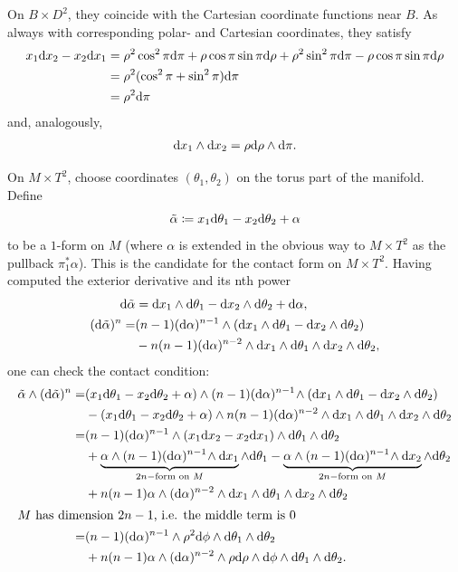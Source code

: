 On $B \times D^2$, they coincide with the Cartesian coordinate functions near $B$.
As always with corresponding polar- and Cartesian coordinates, they satisfy
\begin{align*}
    x_1 \mathrm{d} x_2 - x_2 \mathrm{d} x_1 &= \rho^2 \cos^2 \pi \mathrm{d} \pi + \rho \cos \pi \sin \pi \mathrm{d} \rho + \rho^2 \sin^2 \pi \mathrm{d} \pi - \rho \cos \pi \sin \pi \mathrm{d} \rho\\
    &= \rho^2 (\cos^2 \pi + \sin^2 \pi) \mathrm{d} \pi\\
    &= \rho^2 \mathrm{d} \pi
\end{align*}
and, analogously,
\begin{align*}
    \mathrm{d} x_1 \wedge \mathrm{d} x_2 = \rho \mathrm{d} \rho \wedge \mathrm{d} \pi.
\end{align*}

On $M\times T^2$, choose coordinates $(\theta_1, \theta_2)$ on the torus part of the manifold.
Define
\[
    \tilde \alpha \coloneqq x_1 \mathrm{d} \theta_1 - x_2 \mathrm{d} \theta_2 + \alpha
\]
to be a $1$-form on $M$ (where $\alpha$ is extended in the obvious way to $M\times T^2$ as the pullback $\pi_1^*\alpha$).
This is the candidate for the contact form on $M\times T^2$.
Having computed the exterior derivative and its nth power
\begin{align*}
    \mathrm{d} \tilde \alpha &= \mathrm{d} x_1 \wedge \mathrm{d} \theta_1 - \mathrm{d} x_2 \wedge \mathrm{d} \theta_2 + \mathrm{d} \alpha,\\
    (\mathrm{d} \tilde \alpha)^n =& (n-1)(\mathrm{d} \alpha)^{n-1}\wedge (\mathrm{d} x_1 \wedge \mathrm{d} \theta_1 - \mathrm{d} x_2 \wedge \mathrm{d} \theta_2)\\
    &- n(n-1)(\mathrm{d} \alpha)^{n-2}\wedge \mathrm{d} x_1 \wedge \mathrm{d} \theta_1 \wedge \mathrm{d} x_2 \wedge \mathrm{d} \theta_2,
\end{align*}
one can check the contact condition:
\begin{align*}
    \tilde \alpha \wedge (\mathrm{d} \tilde \alpha)^n =& (x_1 \mathrm{d} \theta_1 - x_2 \mathrm{d} \theta_2 + \alpha) \wedge (n-1)(\mathrm{d} \alpha)^{n-1}\!\wedge (\mathrm{d} x_1 \wedge \mathrm{d} \theta_1 - \mathrm{d} x_2 \wedge \mathrm{d} \theta_2)\\
    &- (x_1 \mathrm{d} \theta_1 - x_2 \mathrm{d} \theta_2 + \alpha) \wedge n(n-1)(\mathrm{d} \alpha)^{n-2}\wedge \mathrm{d} x_1 \wedge \mathrm{d} \theta_1 \wedge \mathrm{d} x_2 \wedge \mathrm{d} \theta_2\\
    =& (n-1)(\mathrm{d} \alpha)^{n-1}\wedge(x_1\mathrm{d} x_2 - x_2 \mathrm{d} x_1)\wedge \mathrm{d} \theta_1 \wedge \mathrm{d} \theta_2\\
    &+\underbrace{\alpha\wedge(n-1)(\mathrm{d} \alpha)^{n-1}\!\wedge \mathrm{d} x_1}_{2n-\text{form on } M} \wedge \mathrm{d} \theta_1 - \underbrace{\alpha \wedge (n-1)(\mathrm{d} \alpha)^{n-1}\!\wedge\mathrm{d} x_2}_{2n-\text{form on } M} \wedge \mathrm{d} \theta_2\\
    & + n(n-1)\alpha\wedge(\mathrm{d} \alpha)^{n-2}\wedge \mathrm{d} x_1 \wedge \mathrm{d} \theta_1 \wedge \mathrm{d} x_2 \wedge \mathrm{d} \theta_2\\
    \intertext{$M$ has dimension $2n-1$, i.e. the middle term is 0}
    =& (n-1)(\mathrm{d} \alpha)^{n-1}\wedge \rho^2 \mathrm{d}\phi \wedge \mathrm{d} \theta_1 \wedge \mathrm{d} \theta_2\\
    & + n(n-1)\alpha \wedge (\mathrm{d} \alpha)^{n-2}\wedge \rho \mathrm{d}\rho \wedge \mathrm{d} \phi \wedge \mathrm{d} \theta_1 \wedge \mathrm{d} \theta_2.
\end{align*}
